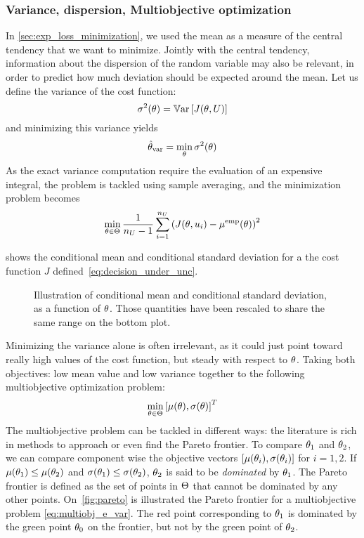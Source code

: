 \documentclass[../../Main_ManuscritThese.tex]{subfiles}
\newcommand\imgpath{/home/victor/acadwriting/Manuscrit/Text/Chapter3/img/}
\begin{document}
\subsubsection{Variance, dispersion, Multiobjective optimization}
\label{sec:multiobjective_optimization}
In \cref{sec:exp_loss_minimization}, we used the mean as a measure of the central tendency that we want to minimize. Jointly with the central tendency, information about the dispersion of the random variable may also be relevant, in order to predict how much deviation should be expected around the mean.
Let us define the variance of the cost function:
\begin{equation}
  \sigma^2(\theta) = \mathbb{V}\mathrm{ar}\left[J(\theta,U)\right]
\end{equation}
and minimizing this variance yields
\begin{equation}
  \hat{\theta}_{\mathrm{var}} = \min_{\theta} \sigma^2(\theta)
\end{equation}
As the exact variance computation require the evaluation of an expensive integral, the problem is tackled using sample averaging, and the minimization problem becomes
\begin{equation}
  \min_{\theta\in \Theta} \frac{1}{n_{U}-1} \sum_{i=1}^{n_{U}} \left(J(\theta, u_i) - \mu^{\mathrm{emp}}(\theta)\right)^2
\end{equation}

 shows the conditional mean and conditional standard deviation for a the cost function $J$ defined~\cref{eq:decision_under_unc}.
\begin{figure}[ht]
  \centering
  
  \caption{Illustration of conditional mean and conditional standard deviation, as a function of $\theta$. Those quantities have been rescaled to share the same range on the bottom plot.}
  \label{fig:mean_std} 
\end{figure}

Minimizing the variance alone is often irrelevant, as it could just point toward really high values of the cost function, but steady with respect to $\theta$. Taking both objectives: low mean value and low variance together to the following multiobjective optimization problem:
\begin{align}
  \label{eq:multiobj_e_var}
  \min_{\theta\in\Theta} \left[\mu(\theta),\sigma(\theta)\right]^T
\end{align}
The multiobjective problem can be tackled in different ways: the literature is rich in methods to approach or even find the Pareto frontier. To compare $\theta_1$ and $\theta_2$, we can compare component wise the objective vectors $[\mu(\theta_i),\sigma(\theta_i)]$ for $i=1,2$. If $\mu(\theta_1) \leq \mu(\theta_2)$ and $\sigma(\theta_1) \leq \sigma(\theta_2)$, $\theta_2$ is said to be \emph{dominated} by $\theta_1$. The Pareto frontier is defined as the set of points in $\Theta$ that cannot be dominated by any other points.
On~\cref{fig:pareto} is illustrated the Pareto frontier for a multiobjective problem \cref{eq:multiobj_e_var}. The red point corresponding to $\theta_1$ is dominated by the green point $\theta_0$ on the frontier, but not by the green point of $\theta_2$.
\end{document}
